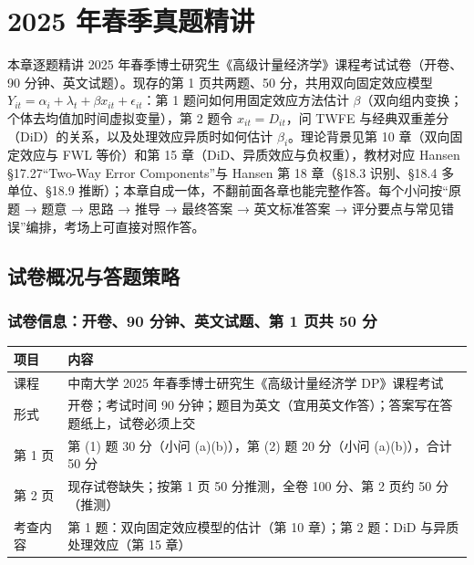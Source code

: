 \chapter{2025 年春季真题精讲}
\label{ch:U17a-exam}
\providecommand{\UXVIIalabel}[1]{\expandafter\def\csname @currentlabel\endcsname{\thetcbcounter}\label{#1}}

本章逐题精讲 2025 年春季博士研究生《高级计量经济学》课程考试试卷（开卷、90 分钟、英文试题）。现存的第 1 页共两题、50 分，共用双向固定效应模型 $Y_{it}=\alpha_i+\lambda_t+\beta x_{it}+\epsilon_{it}$：第 1 题问如何用固定效应方法估计 $\beta$（双向组内变换；个体去均值加时间虚拟变量），第 2 题令 $x_{it}=D_{it}$，问 TWFE 与经典双重差分（DiD）的关系，以及处理效应异质时如何估计 $\beta_i$。理论背景见第 10 章（双向固定效应与 FWL 等价）和第 15 章（DiD、异质效应与负权重），教材对应 Hansen §17.27“Two-Way Error Components”与 Hansen 第 18 章（§18.3 识别、§18.4 多单位、§18.9 推断）；本章自成一体，不翻前面各章也能完整作答。每个小问按“原题 → 题意 → 思路 → 推导 → 最终答案 → 英文标准答案 → 评分要点与常见错误”编排，考场上可直接对照作答。

\section{试卷概况与答题策略}\label{sec:U17a-overview}

\subsection{试卷信息：开卷、90 分钟、英文试题、第 1 页共 50 分}

\begin{center}
\small
\begin{tabularx}{\linewidth}{lL}
\toprule
项目 & 内容\\
\midrule
课程 & 中南大学 2025 年春季博士研究生《高级计量经济学 DP》课程考试\\
形式 & 开卷；考试时间 90 分钟；题目为英文（宜用英文作答）；答案写在答题纸上，试卷必须上交\\
第 1 页 & 第 (1) 题 30 分（小问 (a)(b)），第 (2) 题 20 分（小问 (a)(b)），合计 50 分\\
第 2 页 & 现存试卷缺失；按第 1 页 50 分推测，全卷 100 分、第 2 页约 50 分（推测）\\
考查内容 & 第 1 题：双向固定效应模型的估计（第 10 章）；第 2 题：DiD 与异质处理效应（第 15 章）\\
\bottomrule
\end{tabularx}
\label{tab:U17a-info}
\end{center}

